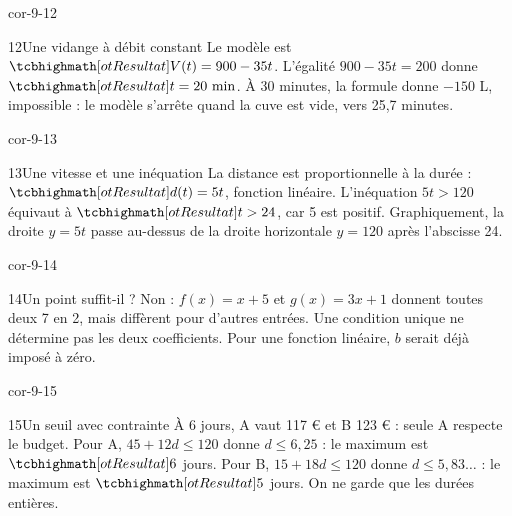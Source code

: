 \begin{blocLivre}{cor-9-12}\begin{corrige}{12}{Une vidange à débit constant}
Le modèle est $\res{V(t)=900-35t}$. L’égalité $900-35t=200$ donne $\res{t=20\text{ min}}$. À 30 minutes, la formule donne $-150$ L, impossible : le modèle s’arrête quand la cuve est vide, vers 25,7 minutes.
\end{corrige}\end{blocLivre}
\begin{blocLivre}{cor-9-13}\begin{corrige}{13}{Une vitesse et une inéquation}
La distance est proportionnelle à la durée : $\res{d(t)=5t}$, fonction linéaire. L’inéquation $5t>120$ équivaut à $\res{t>24}$, car 5 est positif. Graphiquement, la droite $y=5t$ passe au-dessus de la droite horizontale $y=120$ après l’abscisse 24.
\end{corrige}\end{blocLivre}
\begin{blocLivre}{cor-9-14}\begin{corrige}{14}{Un point suffit-il ?}
Non : $f(x)=x+5$ et $g(x)=3x+1$ donnent toutes deux 7 en 2, mais diffèrent pour d’autres entrées. Une condition unique ne détermine pas les deux coefficients. Pour une fonction linéaire, $b$ serait déjà imposé à zéro.
\end{corrige}\end{blocLivre}
\begin{blocLivre}{cor-9-15}\begin{corrige}{15}{Un seuil avec contrainte}
À 6 jours, A vaut 117 € et B 123 € : seule A respecte le budget. Pour A, $45+12d\le120$ donne $d\le6{,}25$ : le maximum est $\res6$ jours. Pour B, $15+18d\le120$ donne $d\le5{,}83\ldots$ : le maximum est $\res5$ jours. On ne garde que les durées entières.
\end{corrige}\end{blocLivre}
